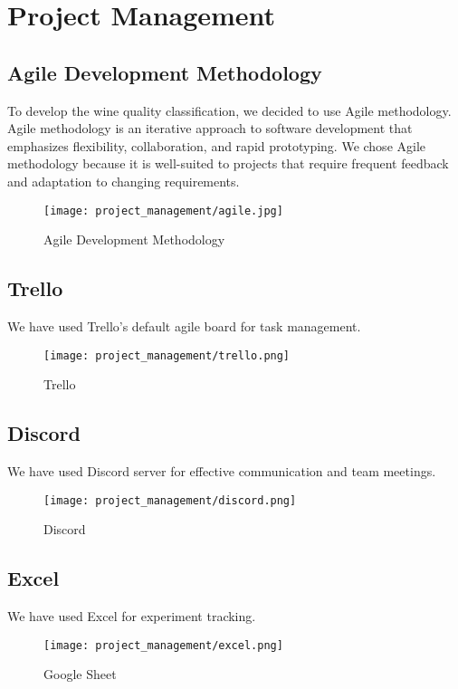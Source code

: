 \chapter{Project Management}
\section{Agile Development Methodology}
To develop the wine quality classification, we decided to use Agile methodology. Agile methodology is an iterative approach to software development that emphasizes flexibility, collaboration, and rapid prototyping. We chose Agile methodology because it is well-suited to projects that require frequent feedback and adaptation to changing requirements.

\begin{figure}[H]
    \centering
    \texttt{[image: project\_management/agile.jpg]}
    \caption{Agile Development Methodology}
    \label{fig:Agile Development Methodology}
\end{figure}

\section{Trello}
We have used Trello's default agile board for task management. 
\begin{figure}[H]
    \centering
    \texttt{[image: project\_management/trello.png]}
    \caption{Trello}
    \label{fig:Trello}
\end{figure}

\section{Discord}
We have used Discord server for effective communication and team meetings.

\begin{figure}[H]
    \centering
    \texttt{[image: project\_management/discord.png]}
    \caption{Discord}
    \label{fig:Discord}
\end{figure}

\section{Excel}
We have used Excel for experiment tracking.
\begin{figure}[H]
    \centering
    \texttt{[image: project\_management/excel.png]}
    \caption{Google Sheet}
    \label{fig:Google Sheet}
\end{figure}

